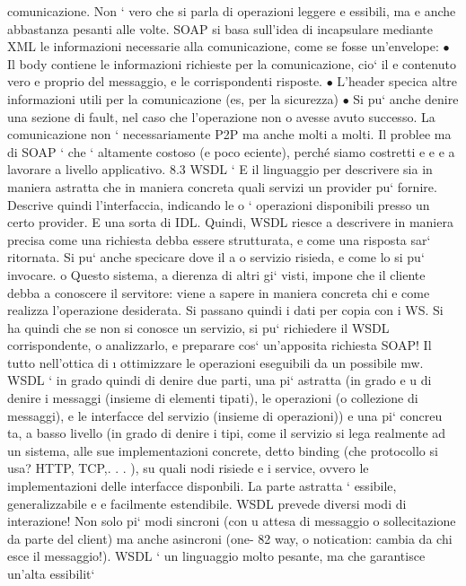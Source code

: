 \documentclass[a4paper,12pt]{article}
\begin{document}
comunicazione. Non ` vero che si parla di operazioni leggere e essibili, ma
e
anche abbastanza pesanti alle volte.
SOAP si basa sull'idea di incapsulare mediante XML le informazioni necessarie alla comunicazione, come se fosse
un'envelope:
$\bullet$ Il body contiene le informazioni richieste per la comunicazione, cio` il
e
contenuto vero e proprio del messaggio, e le corrispondenti risposte.
$\bullet$ L'header specica altre informazioni utili per la comunicazione (es, per la
sicurezza)
$\bullet$ Si pu` anche denire una sezione di fault, nel caso che l'operazione non
o
avesse avuto successo.
La comunicazione non ` necessariamente P2P ma anche molti a molti. Il problee
ma di SOAP ` che ` altamente costoso (e poco eciente), perché siamo costretti
e
e
e
a lavorare a livello applicativo.
8.3
WSDL
`
E il linguaggio per descrivere sia in maniera astratta che in maniera concreta
quali servizi un provider pu` fornire. Descrive quindi l'interfaccia, indicando le
o
`
operazioni disponibili presso un certo provider. E una sorta di IDL. Quindi,
WSDL riesce a descrivere in maniera precisa come una richiesta debba essere
strutturata, e come una risposta sar` ritornata. Si pu` anche specicare dove il
a
o
servizio risieda, e come lo si pu` invocare.
o
Questo sistema, a dierenza di altri gi` visti, impone che il cliente debba
a
conoscere il servitore: viene a sapere in maniera concreta chi e come realizza
l'operazione desiderata. Si passano quindi i dati per copia con i WS. Si ha quindi che se non si conosce un servizio, si
pu` richiedere il WSDL corrispondente,
o
analizzarlo, e preparare cos` un'apposita richiesta SOAP! Il tutto nell'ottica di
\i{}
ottimizzare le operazioni eseguibili da un possibile mw.
WSDL ` in grado quindi di denire due parti, una pi` astratta (in grado
e
u
di denire i messaggi (insieme di elementi tipati), le operazioni (o collezione di
messaggi), e le interfacce del servizio (insieme di operazioni)) e una pi` concreu
ta, a basso livello (in grado di denire i tipi, come il servizio si lega realmente
ad un sistema, alle sue implementazioni concrete, detto binding (che protocollo
si usa? HTTP, TCP,. . . ), su quali nodi risiede e i service, ovvero le implementazioni delle interfacce disponbili. La
parte astratta ` essibile, generalizzabile
e
e facilmente estendibile.
WSDL prevede diversi modi di interazione! Non solo pi` modi sincroni (con
u
attesa di messaggio o sollecitazione da parte del client) ma anche asincroni (one-
82
way, o notication: cambia da chi esce il messaggio!).
WSDL ` un linguaggio molto pesante, ma che garantisce un'alta essibilit`
\end{document}
